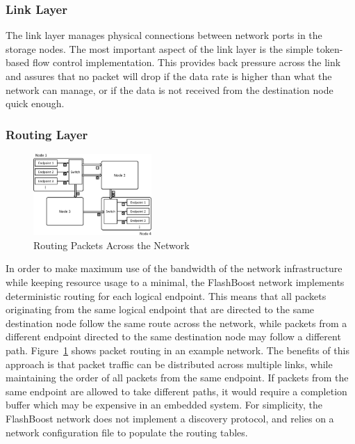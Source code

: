 \subsubsection{Link Layer}

The link layer manages physical connections between network ports in the storage
nodes. The most important aspect of the link layer is the simple token-based
flow control implementation. This provides back pressure across the link and
assures that no packet will drop if the data rate is higher than what the
network can manage, or if the data is not received from the destination node
quick enough.

\subsubsection{Routing Layer}


\begin{figure}[h]
	\begin{center}
	\includegraphics[width=0.4\textwidth]{figures/routing-crop.pdf}
	\caption{Routing Packets Across the Network}
	\label{fig:networkrouting}
	\end{center}
\end{figure}

In order to make maximum use of the bandwidth of the network infrastructure
while keeping resource usage to a minimal, the FlashBoost network implements
deterministic routing for each logical endpoint. This means that all packets
originating from the same logical endpoint that are directed to the same
destination node follow the same route across the network, while packets from a
different endpoint directed to the same destination node may follow a different
path. Figure~\ref{fig:networkrouting} shows packet routing in an example
network. The benefits of this approach is that packet traffic can be distributed
across multiple links, while maintaining the order of all packets from the same
endpoint. If packets from the same endpoint are allowed to take different paths,
it would require a completion buffer which may be expensive in an embedded
system.
For simplicity, the FlashBoost network does not implement a discovery protocol, and relies on a
network configuration file to populate the routing tables. 


